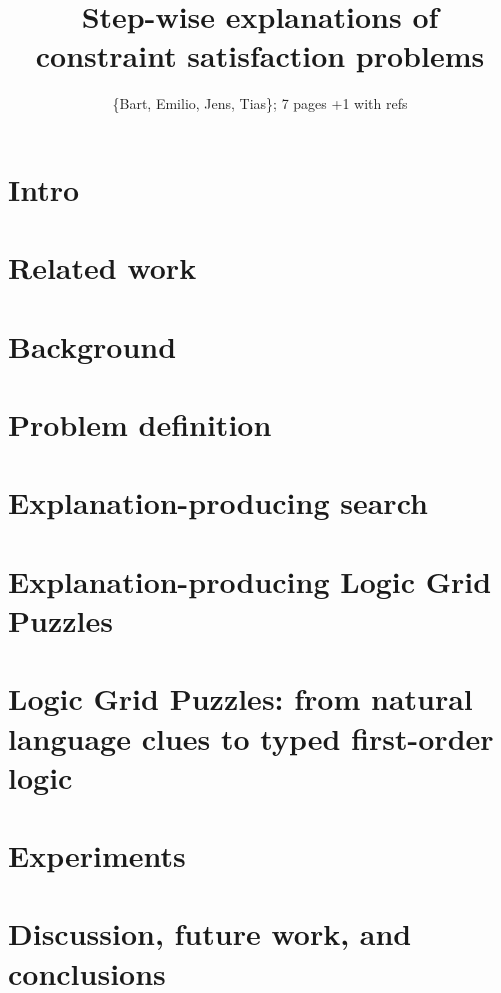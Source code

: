 \documentclass{ecai}
\begin{document}
\title{Step-wise explanations of constraint satisfaction problems}

\author{\{Bart, Emilio, Jens, Tias\}; 7 pages +1 with refs}

\maketitle


\begin{abstract}

\end{abstract}


\section{Intro}


\section{Related work}


\section{Background}


\section{Problem definition}



\section{Explanation-producing search}\label{sec:expl-gen-prod}



\section{Explanation-producing Logic Grid Puzzles}



\section{Logic Grid Puzzles: from natural language clues to typed first-order logic}\label{sec:holistic}



\section{Experiments}


\section{Discussion, future work, and conclusions}



\end{document}
